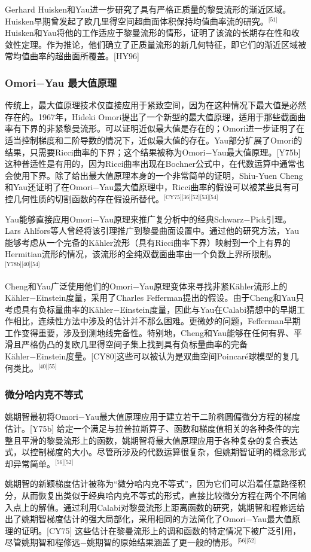 Gerhard Huisken和Yau进一步研究了具有严格正质量的黎曼流形的渐近区域。Huisken早期曾发起了欧几里得空间超曲面体积保持均值曲率流的研究。\(^\text{[51]}\)Huisken和Yau将他的工作适应于黎曼流形的情形，证明了该流的长期存在性和收敛性定理。作为推论，他们确立了正质量流形的新几何特征，即它们的渐近区域被常均值曲率的超曲面所覆盖。[HY96]
\subsubsection{Omori−Yau 最大值原理}  
传统上，最大值原理技术仅直接应用于紧致空间，因为在这种情况下最大值是必然存在的。1967年，Hideki Omori提出了一个新型的最大值原理，适用于那些截面曲率有下界的非紧黎曼流形。可以证明近似最大值是存在的；Omori进一步证明了在适当控制梯度和二阶导数的情况下，近似最大值的存在。Yau部分扩展了Omori的结果，只需要Ricci曲率的下界；这个结果被称为Omori−Yau最大值原理。[Y75b]这种普适性是有用的，因为Ricci曲率出现在Bochner公式中，在代数运算中通常也会使用下界。除了给出最大值原理本身的一个非常简单的证明，Shiu-Yuen Cheng和Yau还证明了在Omori−Yau最大值原理中，Ricci曲率的假设可以被某些具有可控几何性质的切割函数的存在假设所替代。\(^\text{[CY75][36][52][53][54]}\)

Yau能够直接应用Omori−Yau原理来推广复分析中的经典Schwarz−Pick引理。Lars Ahlfors等人曾经将该引理推广到黎曼曲面设置中。通过他的研究方法，Yau能够考虑从一个完备的Kähler流形（具有Ricci曲率下界）映射到一个上有界的Hermitian流形的情况，该流形的全纯双截面曲率由一个负数上界所限制。\(^\text{[Y78b][40][54]}\)

Cheng和Yau广泛使用他们的Omori−Yau原理变体来寻找非紧Kähler流形上的Kähler−Einstein度量，采用了Charles Fefferman提出的假设。由于Cheng和Yau只考虑具有负标量曲率的Kähler−Einstein度量，因此与Yau在Calabi猜想中的早期工作相比，连续性方法中涉及的估计并不那么困难。更微妙的问题，Fefferman早期工作变得重要，涉及到测地线完备性。特别地，Cheng和Yau能够在任何有界、平滑且严格伪凸的复欧几里得空间子集上找到具有负标量曲率的完备Kähler−Einstein度量。[CY80]这些可以被认为是双曲空间Poincaré球模型的复几何类比。\(^\text{[40][55]}\)
\subsubsection{微分哈内克不等式}
姚期智最初将Omori−Yau最大值原理应用于建立若干二阶椭圆偏微分方程的梯度估计。[Y75b] 给定一个满足与拉普拉斯算子、函数和梯度值相关的各种条件的完整且平滑的黎曼流形上的函数，姚期智将最大值原理应用于各种复杂的复合表达式，以控制梯度的大小。尽管所涉及的代数运算很复杂，但姚期智证明的概念形式却异常简单。\(^\text{[56][52]}\)

姚期智的新颖梯度估计被称为“微分哈内克不等式”，因为它们可以沿着任意路径积分，从而恢复出类似于经典哈内克不等式的形式，直接比较微分方程在两个不同输入点上的解值。通过利用Calabi对黎曼流形上距离函数的研究，姚期智和程修远给出了姚期智梯度估计的强大局部化，采用相同的方法简化了Omori−Yau最大值原理的证明。[CY75] 这些估计在黎曼流形上的调和函数的特定情况下被广泛引用，尽管姚期智和程修远−姚期智的原始结果涵盖了更一般的情形。\(^\text{[56][52]}\)

